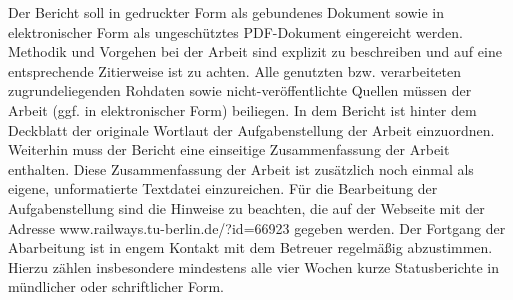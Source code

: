 Der Bericht soll in gedruckter Form als gebundenes Dokument sowie in elektronischer Form als ungeschütztes PDF-Dokument eingereicht werden. Methodik und Vorgehen bei der Arbeit sind explizit zu beschreiben und auf eine entsprechende Zitierweise ist zu achten. Alle genutzten bzw. verarbeiteten zugrundeliegenden Rohdaten sowie nicht-veröffentlichte Quellen müssen der Arbeit (ggf. in elektronischer Form) beiliegen. In dem Bericht ist hinter dem Deckblatt der originale Wortlaut der Aufgabenstellung der Arbeit einzuordnen. Weiterhin muss der Bericht eine einseitige Zusammenfassung der Arbeit enthalten. Diese Zusammenfassung der Arbeit ist zusätzlich noch einmal als eigene, unformatierte Textdatei einzureichen. Für die Bearbeitung der Aufgabenstellung sind die Hinweise zu beachten, die auf der Webseite mit der Adresse www.railways.tu-berlin.de/?id=66923 gegeben werden. Der Fortgang der Abarbeitung ist in engem Kontakt mit dem Betreuer regelmäßig abzustimmen. Hierzu zählen insbesondere mindestens alle vier Wochen kurze Statusberichte in mündlicher oder schriftlicher Form.
\newpage